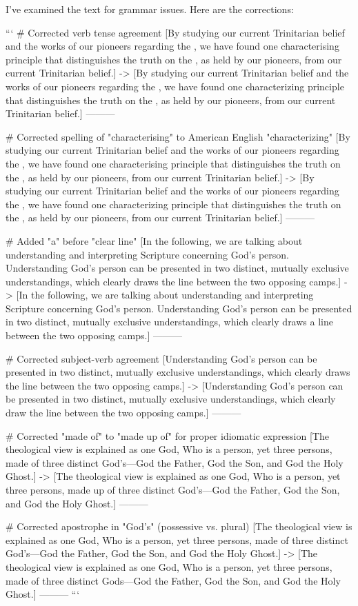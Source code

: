 I've examined the text for grammar issues. Here are the corrections:

```
# Corrected verb tense agreement
[By studying our current Trinitarian belief and the works of our pioneers regarding the , we have found one characterising principle that distinguishes the truth on the , as held by our pioneers, from our current Trinitarian belief.]
->
[By studying our current Trinitarian belief and the works of our pioneers regarding the , we have found one characterizing principle that distinguishes the truth on the , as held by our pioneers, from our current Trinitarian belief.]
---------

# Corrected spelling of "characterising" to American English "characterizing"
[By studying our current Trinitarian belief and the works of our pioneers regarding the , we have found one characterising principle that distinguishes the truth on the , as held by our pioneers, from our current Trinitarian belief.]
->
[By studying our current Trinitarian belief and the works of our pioneers regarding the , we have found one characterizing principle that distinguishes the truth on the , as held by our pioneers, from our current Trinitarian belief.]
---------

# Added "a" before "clear line"
[In the following, we are talking about understanding and interpreting Scripture concerning God's person. Understanding God's person can be presented in two distinct, mutually exclusive understandings, which clearly draws the line between the two opposing camps.]
->
[In the following, we are talking about understanding and interpreting Scripture concerning God's person. Understanding God's person can be presented in two distinct, mutually exclusive understandings, which clearly draws a line between the two opposing camps.]
---------

# Corrected subject-verb agreement
[Understanding God's person can be presented in two distinct, mutually exclusive understandings, which clearly draws the line between the two opposing camps.]
->
[Understanding God's person can be presented in two distinct, mutually exclusive understandings, which clearly draw the line between the two opposing camps.]
---------

# Corrected "made of" to "made up of" for proper idiomatic expression
[The theological view is explained as one God, Who is a person, yet three persons, made of three distinct God's—God the Father, God the Son, and God the Holy Ghost.]
->
[The theological view is explained as one God, Who is a person, yet three persons, made up of three distinct God's—God the Father, God the Son, and God the Holy Ghost.]
---------

# Corrected apostrophe in "God's" (possessive vs. plural)
[The theological view is explained as one God, Who is a person, yet three persons, made of three distinct God's—God the Father, God the Son, and God the Holy Ghost.]
->
[The theological view is explained as one God, Who is a person, yet three persons, made of three distinct Gods—God the Father, God the Son, and God the Holy Ghost.]
---------
```